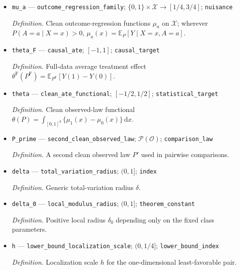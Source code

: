 \documentclass{article}
\begin{document}
\begin{itemize}
  \par\smallskip\noindent\emph{Definition.} Clean propensity score \(e(x)=P(A=1\mid X=x)\).
  \item \texttt{mu\_\allowbreak{}a} --- \texttt{outcome\_\allowbreak{}regression\_\allowbreak{}family}; \(\{0,1\}\times\mathcal X\to[1/4,3/4]\); \texttt{nuisance}
  \par\smallskip\noindent\emph{Definition.} Clean outcome-regression functions \(\mu_a\) on \(\mathcal X\); wherever \(P(A=a\mid X=x)>0\), \(\mu_a(x)=\mathbb E_P[Y\mid X=x,A=a]\).
  \item \texttt{theta\_\allowbreak{}F} --- \texttt{causal\_\allowbreak{}ate}; \([-1,1]\); \texttt{causal\_\allowbreak{}target}
  \par\smallskip\noindent\emph{Definition.} Full-data average treatment effect \(\theta^{\mathrm F}(P^{\mathrm F})=\mathbb E_{P^{\mathrm F}}[Y(1)-Y(0)]\).
  \item \texttt{theta} --- \texttt{clean\_\allowbreak{}ate\_\allowbreak{}functional}; \([-1/2,1/2]\); \texttt{statistical\_\allowbreak{}target}
  \par\smallskip\noindent\emph{Definition.} Clean observed-law functional \(\theta(P)=\int_{[0,1]^d}\{\mu_1(x)-\mu_0(x)\}\,\mathrm dx\).
  \item \texttt{P\_\allowbreak{}prime} --- \texttt{second\_\allowbreak{}clean\_\allowbreak{}observed\_\allowbreak{}law}; \(\mathcal P(\mathcal O)\); \texttt{comparison\_\allowbreak{}law}
  \par\smallskip\noindent\emph{Definition.} A second clean observed law \(P'\) used in pairwise comparisons.
  \item \texttt{delta} --- \texttt{total\_\allowbreak{}variation\_\allowbreak{}radius}; \((0,1]\); \texttt{index}
  \par\smallskip\noindent\emph{Definition.} Generic total-variation radius \(\delta\).
  \item \texttt{delta\_\allowbreak{}0} --- \texttt{local\_\allowbreak{}modulus\_\allowbreak{}radius}; \((0,1]\); \texttt{theorem\_\allowbreak{}constant}
  \par\smallskip\noindent\emph{Definition.} Positive local radius \(\delta_0\) depending only on the fixed class parameters.
  \item \texttt{h} --- \texttt{lower\_\allowbreak{}bound\_\allowbreak{}localization\_\allowbreak{}scale}; \((0,1/4]\); \texttt{lower\_\allowbreak{}bound\_\allowbreak{}index}
  \par\smallskip\noindent\emph{Definition.} Localization scale \(h\) for the one-dimensional least-favorable pair.

\end{itemize}
\end{document}

